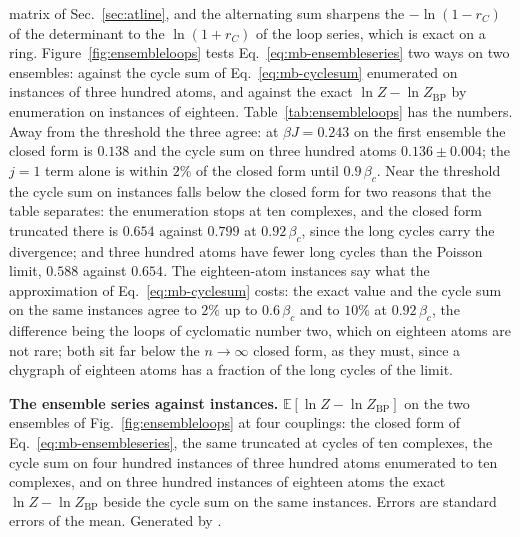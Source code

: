 matrix of Sec.~\ref{sec:atline}, and the alternating sum sharpens the
$-\ln(1-r_{C})$ of the determinant to the $\ln(1+r_{C})$ of the loop
series, which is exact on a ring. Figure~\ref{fig:ensembleloops} tests
Eq.~\eqref{eq:mb-ensembleseries} two ways on two ensembles: against the
cycle sum of Eq.~\eqref{eq:mb-cyclesum} enumerated on instances of three
hundred atoms, and against the exact $\ln Z-\ln Z_{\mathrm{BP}}$ by
enumeration on instances of eighteen. Table~\ref{tab:ensembleloops} has the
numbers. Away from the threshold the three agree: at $\beta J=0.243$ on
the first ensemble the closed form is $0.138$ and the cycle sum on three
hundred atoms $0.136\pm0.004$; the $j=1$ term alone is within $2\%$ of
the closed form until $0.9\,\beta_{c}$. Near the threshold the cycle sum
on instances falls below the closed form for two reasons that the table
separates: the enumeration stops at ten complexes, and the closed form
truncated there is $0.654$ against $0.799$ at $0.92\,\beta_{c}$, since
the long cycles carry the divergence; and three hundred atoms have fewer
long cycles than the Poisson limit, $0.588$ against $0.654$. The
eighteen-atom instances say what the approximation of
Eq.~\eqref{eq:mb-cyclesum} costs: the exact value and the cycle sum on
the same instances agree to $2\%$ up to $0.6\,\beta_{c}$ and to $10\%$ at
$0.92\,\beta_{c}$, the difference being the loops of cyclomatic number
two, which on eighteen atoms are not rare; both sit far below the
$n\to\infty$ closed form, as they must, since a chygraph of eighteen
atoms has a fraction of the long cycles of the limit.

\begin{table}[tb]
\centering
\begin{adjustbox}{width=\linewidth}

\end{adjustbox}
\caption{\textbf{The ensemble series against instances.}
$\mathbb{E}[\ln Z-\ln Z_{\mathrm{BP}}]$ on the two ensembles of
Fig.~\ref{fig:ensembleloops} at four couplings: the closed form of
Eq.~\eqref{eq:mb-ensembleseries}, the same truncated at cycles of ten
complexes, the cycle sum on four hundred instances of three hundred atoms
enumerated to ten complexes, and on three hundred instances of eighteen
atoms the exact $\ln Z-\ln Z_{\mathrm{BP}}$ beside the cycle sum on the
same instances. Errors are standard errors of the mean. Generated by
.}
\label{tab:ensembleloops}
\end{table}

